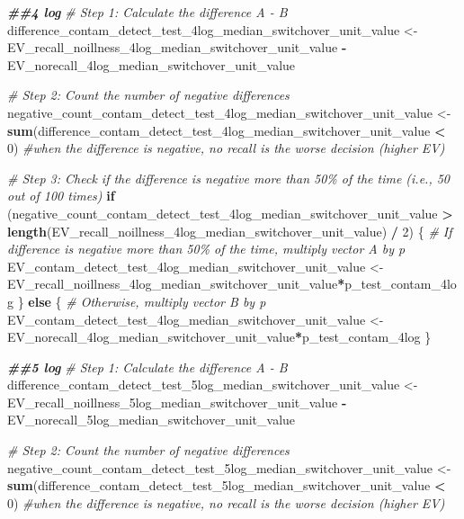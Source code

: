 \documentclass[
]{article}
\newenvironment{Shaded}{\begin{snugshade}}{\end{snugshade}}
\newcommand{\CommentTok}[1]{\textcolor[rgb]{0.56,0.35,0.01}{\textit{#1}}}
\newcommand{\ControlFlowTok}[1]{\textcolor[rgb]{0.13,0.29,0.53}{\textbf{#1}}}
\newcommand{\DecValTok}[1]{\textcolor[rgb]{0.00,0.00,0.81}{#1}}
\newcommand{\DocumentationTok}[1]{\textcolor[rgb]{0.56,0.35,0.01}{\textbf{\textit{#1}}}}
\newcommand{\FunctionTok}[1]{\textcolor[rgb]{0.13,0.29,0.53}{\textbf{#1}}}
\newcommand{\NormalTok}[1]{#1}
\newcommand{\OtherTok}[1]{\textcolor[rgb]{0.56,0.35,0.01}{#1}}
\newcommand{\SpecialCharTok}[1]{\textcolor[rgb]{0.81,0.36,0.00}{\textbf{#1}}}
\begin{document}
\begin{Shaded}
\begin{Highlighting}[]
\DocumentationTok{\#\#4 log}
\CommentTok{\# Step 1: Calculate the difference A {-} B}
\NormalTok{difference\_contam\_detect\_test\_4log\_median\_switchover\_unit\_value }\OtherTok{\textless{}{-}}\NormalTok{ EV\_recall\_noillness\_4log\_median\_switchover\_unit\_value }\SpecialCharTok{{-}}\NormalTok{ EV\_norecall\_4log\_median\_switchover\_unit\_value}

\CommentTok{\# Step 2: Count the number of negative differences}
\NormalTok{negative\_count\_contam\_detect\_test\_4log\_median\_switchover\_unit\_value }\OtherTok{\textless{}{-}} \FunctionTok{sum}\NormalTok{(difference\_contam\_detect\_test\_4log\_median\_switchover\_unit\_value }\SpecialCharTok{\textless{}} \DecValTok{0}\NormalTok{) }\CommentTok{\#when the difference is negative, no recall is the worse decision (higher EV)}

\CommentTok{\# Step 3: Check if the difference is negative more than 50\% of the time (i.e., 50 out of 100 times)}
\ControlFlowTok{if}\NormalTok{ (negative\_count\_contam\_detect\_test\_4log\_median\_switchover\_unit\_value }\SpecialCharTok{\textgreater{}} \FunctionTok{length}\NormalTok{(EV\_recall\_noillness\_4log\_median\_switchover\_unit\_value) }\SpecialCharTok{/} \DecValTok{2}\NormalTok{) \{}
  \CommentTok{\# If difference is negative more than 50\% of the time, multiply vector A by p}
\NormalTok{  EV\_contam\_detect\_test\_4log\_median\_switchover\_unit\_value }\OtherTok{\textless{}{-}}\NormalTok{ EV\_recall\_noillness\_4log\_median\_switchover\_unit\_value}\SpecialCharTok{*}\NormalTok{p\_test\_contam\_4log}
\NormalTok{\} }\ControlFlowTok{else}\NormalTok{ \{}
  \CommentTok{\# Otherwise, multiply vector B by p}
\NormalTok{ EV\_contam\_detect\_test\_4log\_median\_switchover\_unit\_value  }\OtherTok{\textless{}{-}}\NormalTok{ EV\_norecall\_4log\_median\_switchover\_unit\_value}\SpecialCharTok{*}\NormalTok{p\_test\_contam\_4log}
\NormalTok{\}}


\DocumentationTok{\#\#5 log}
\CommentTok{\# Step 1: Calculate the difference A {-} B}
\NormalTok{difference\_contam\_detect\_test\_5log\_median\_switchover\_unit\_value }\OtherTok{\textless{}{-}}\NormalTok{ EV\_recall\_noillness\_5log\_median\_switchover\_unit\_value }\SpecialCharTok{{-}}\NormalTok{ EV\_norecall\_5log\_median\_switchover\_unit\_value}

\CommentTok{\# Step 2: Count the number of negative differences}
\NormalTok{negative\_count\_contam\_detect\_test\_5log\_median\_switchover\_unit\_value }\OtherTok{\textless{}{-}} \FunctionTok{sum}\NormalTok{(difference\_contam\_detect\_test\_5log\_median\_switchover\_unit\_value }\SpecialCharTok{\textless{}} \DecValTok{0}\NormalTok{) }\CommentTok{\#when the difference is negative, no recall is the worse decision (higher EV)}


\end{Highlighting}
\end{Shaded}
\end{document}
